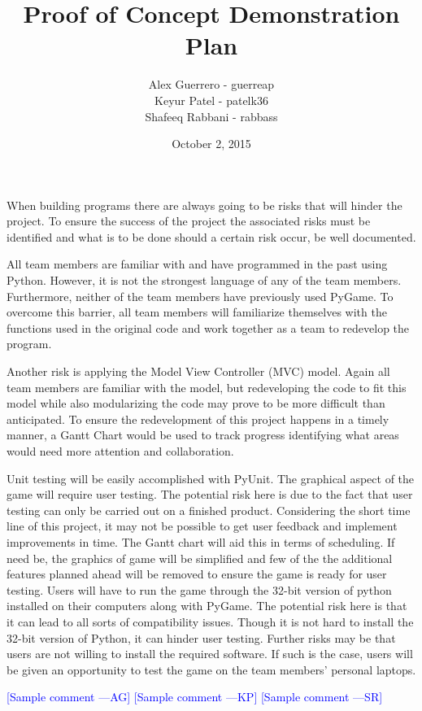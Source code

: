 \documentclass[12pt]{article}
\newcommand{\authornote}[3]{\textcolor{#1}{[#3 ---#2]}}
\newcommand{\authornote}[3]{}
\newcommand{\ag}[1]{\authornote{blue}{AG}{#1}} %
\newcommand{\kp}[1]{\authornote{blue}{KP}{#1}} %
\newcommand{\sr}[1]{\authornote{blue}{SR}{#1}} %
\begin{document}
\title{Proof of Concept Demonstration Plan} 
\author{Alex Guerrero - guerreap\\Keyur Patel - patelk36\\Shafeeq Rabbani - rabbass}
\date{October 2, 2015}
	
\maketitle
	When building programs there are always going to be risks that will hinder the project. To ensure the success of the project the associated risks must be identified and what is to be done should a certain risk occur, be well documented.\par
	All team members are familiar with and have programmed in the past using Python. However, it is not the strongest language of any of the team members. Furthermore, neither of the team members have previously used PyGame. To overcome this barrier, all team members will familiarize themselves with the functions used in the original code and work together as a team to redevelop the program.\par
	Another risk is applying the Model View Controller (MVC) model. Again all team members are familiar with the model, but redeveloping the code to fit this model while also modularizing the code may prove to be more difficult than anticipated. To ensure the redevelopment of this project happens in a timely manner, a Gantt Chart would be used to track progress identifying what areas would need more attention and collaboration.\par
	Unit testing will be easily accomplished with PyUnit. The graphical aspect of the game will require user testing. The potential risk here is due to the fact that user testing can only be carried out on a finished product. Considering the short time line of this project, it may not be possible to get user feedback and implement improvements in time. The Gantt chart will aid this in terms of scheduling. If need be, the graphics of game will be simplified and few of the the additional features planned ahead will be removed to ensure the game is ready for user testing. 	 
	 Users will have to run the game through the 32-bit version of python installed on their computers along with PyGame. The potential risk here is that it can lead to all sorts of compatibility issues. Though it is not hard to install the 32-bit version of Python, it can hinder user testing. Further risks may be that users are not willing to install the required software. If such is the case, users will be given an opportunity to test the game on the team members' personal laptops.\par


\ag{Sample comment}
\kp{Sample comment}
\sr{Sample comment}
\end{document}
